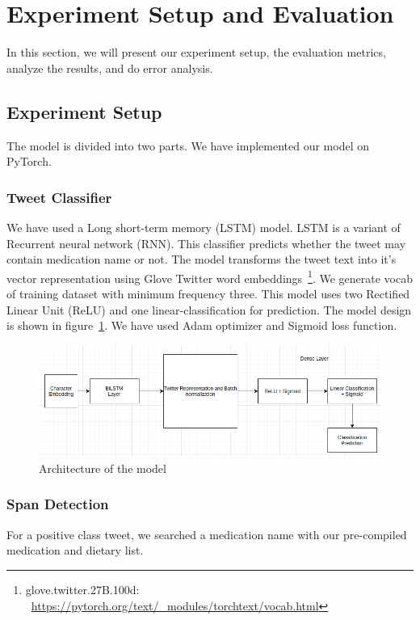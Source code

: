 \section{Experiment Setup and Evaluation}
In this section, we will present our experiment setup, the evaluation metrics, analyze the results, and do error analysis.

\subsection{Experiment Setup}
The model is divided into two parts. We have implemented our model on PyTorch.

\subsubsection{Tweet Classifier}
We have used a Long short-term memory (LSTM) model. LSTM is a variant of Recurrent neural network (RNN). This classifier predicts whether the tweet may contain medication name or not. The model transforms the tweet text into it's vector representation using Glove Twitter word embeddings~\footnote{glove.twitter.27B.100d: ~\url{https://pytorch.org/text/_modules/torchtext/vocab.html}}. We generate vocab of training dataset with minimum frequency three. This model uses two Rectified Linear Unit (ReLU) and one linear-classification for prediction. The model design is shown in figure~\ref{fig:model-imran}. We have used Adam optimizer and Sigmoid loss function.

\begin{figure}[h]
	\centering
	\includegraphics[width=0.99\linewidth]{Figures/model.png}
	\caption{Architecture of the model}
	\label{fig:model-imran}
\end{figure}

\subsubsection{Span Detection}
For a positive class tweet, we searched a medication name with our pre-compiled medication and dietary list. 

